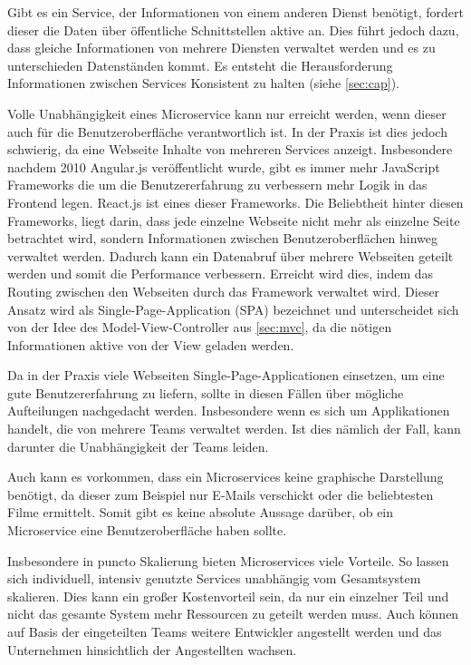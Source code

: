 Gibt es ein Service, der Informationen von einem anderen Dienst benötigt, fordert dieser die Daten über öffentliche Schnittstellen aktive an. Dies führt jedoch dazu, dass gleiche Informationen von mehrere Diensten verwaltet werden und es zu unterschieden Datenständen kommt. Es entsteht die Herausforderung Informationen zwischen Services Konsistent zu halten (siehe \cref{sec:cap}).

Volle Unabhängigkeit eines Microservice kann nur erreicht werden, wenn dieser auch für die Benutzeroberfläche verantwortlich ist. In der Praxis ist dies jedoch schwierig, da eine Webseite  Inhalte von mehreren Services anzeigt. Insbesondere nachdem 2010 Angular.js veröffentlicht wurde, gibt es immer mehr JavaScript Frameworks die um die Benutzererfahrung zu verbessern mehr Logik in das Frontend legen. React.js ist eines dieser Frameworks. Die Beliebtheit hinter diesen Frameworks, liegt darin, dass jede einzelne Webseite nicht mehr als einzelne Seite betrachtet wird, sondern Informationen zwischen Benutzeroberflächen hinweg verwaltet werden. Dadurch kann ein Datenabruf über mehrere Webseiten geteilt werden und somit die Performance verbessern. Erreicht wird dies, indem das Routing zwischen den Webseiten durch das Framework verwaltet wird. Dieser Ansatz wird als Single-Page-Application (SPA) bezeichnet und unterscheidet sich von der Idee des Model-View-Controller aus \cref{sec:mvc}, da die nötigen Informationen aktive von der View geladen werden.

Da in der Praxis viele Webseiten Single-Page-Applicationen einsetzen, um eine gute Benutzererfahrung zu liefern, sollte in diesen Fällen über mögliche Aufteilungen nachgedacht werden. Insbesondere wenn es sich um Applikationen handelt, die von mehrere Teams verwaltet werden. Ist dies nämlich der Fall, kann darunter die Unabhängigkeit der Teams leiden.

Auch kann es vorkommen, dass ein Microservices keine graphische Darstellung benötigt, da dieser zum Beispiel nur E-Mails verschickt oder die beliebtesten Filme ermittelt. Somit gibt es keine absolute Aussage darüber, ob ein Microservice eine Benutzeroberfläche haben sollte.

Insbesondere in puncto Skalierung bieten Microservices viele Vorteile. So lassen sich individuell, intensiv genutzte Services unabhängig vom Gesamtsystem skalieren. Dies kann ein großer Kostenvorteil sein, da nur ein einzelner Teil und nicht das gesamte System mehr Ressourcen zu geteilt werden muss. Auch können auf Basis der eingeteilten Teams weitere Entwickler angestellt werden und das Unternehmen hinsichtlich der Angestellten wachsen.

